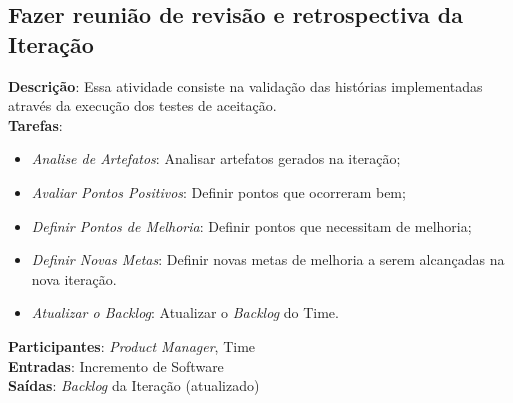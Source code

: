 \subsection{Fazer reunião de revisão e retrospectiva da Iteração}
  \textbf{Descrição}: Essa atividade consiste na validação das histórias implementadas através da execução dos testes de aceitação. \\

  \textbf{Tarefas}:
  \begin{itemize}
   \item \indent \textit{Analise de Artefatos}: Analisar artefatos gerados na iteração;

   \item \indent \textit{Avaliar Pontos Positivos}: Definir pontos que ocorreram bem;

   \item \indent \textit{Definir Pontos de Melhoria}: Definir pontos que necessitam de melhoria;

   \item \indent \textit{Definir Novas Metas}: Definir novas metas de melhoria a serem alcançadas na nova iteração.
   
   \item \indent \textit{Atualizar o \textit{Backlog}}: Atualizar o \textit{Backlog} do Time.
  \end{itemize}

  \textbf{Participantes}: \textit{Product Manager}, Time\\

  \textbf{Entradas}: Incremento de Software \\

  \textbf{Saídas}:   \textit{Backlog} da Iteração (atualizado)\\
